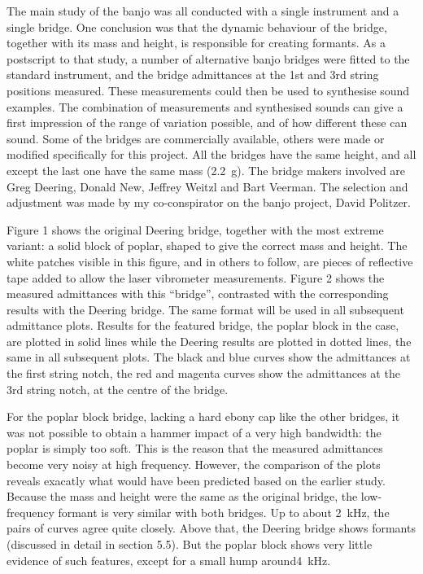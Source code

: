   The main study of the banjo was all conducted with a single instrument and a 
  single bridge. One conclusion was that the dynamic behaviour of the bridge, 
  together with its mass and height, is responsible for creating formants. As a 
  postscript to that study, a number of alternative banjo bridges were fitted 
  to the standard instrument, and the bridge admittances at the 1st and 3rd 
  string positions measured. These measurements could then be used to 
  synthesise sound examples. The combination of measurements and synthesised 
  sounds can give a first impression of the range of variation possible, and of 
  how different these can sound. Some of the bridges are commercially 
  available, others were made or modified specifically for this project. All 
  the bridges have the same height, and all except the last one have the same 
  mass (2.2~g). The bridge makers involved are Greg Deering, Donald New, 
  Jeffrey Weitzl and Bart Veerman. The selection and adjustment was made by my 
  co-conspirator on the banjo project, David Politzer. 

  Figure 1 shows the original Deering bridge, together with the most extreme 
  variant: a solid block of poplar, shaped to give the correct mass and height. 
  The white patches visible in this figure, and in others to follow, are pieces 
  of reflective tape added to allow the laser vibrometer measurements. Figure 2 
  shows the measured admittances with this ``bridge'', contrasted with the 
  corresponding results with the Deering bridge. The same format will be used 
  in all subsequent admittance plots. Results for the featured bridge, the 
  poplar block in the case, are plotted in solid lines while the Deering 
  results are plotted in dotted lines, the same in all subsequent plots. The 
  black and blue curves show the admittances at the first string notch, the red 
  and magenta curves show the admittances at the 3rd string notch, at the 
  centre of the bridge. 



  For the poplar block bridge, lacking a hard ebony cap like the other bridges, 
  it was not possible to obtain a hammer impact of a very high bandwidth: the 
  poplar is simply too soft. This is the reason that the measured admittances 
  become very noisy at high frequency. However, the comparison of the plots 
  reveals exacatly what would have been predicted based on the earlier study. 
  Because the mass and height were the same as the original bridge, the 
  low-frequency formant is very similar with both bridges. Up to about 2~kHz, 
  the pairs of curves agree quite closely. Above that, the Deering bridge shows 
  formants (discussed in detail in section 5.5). But the poplar block shows 
  very little evidence of such features, except for a small hump around4~kHz. 

